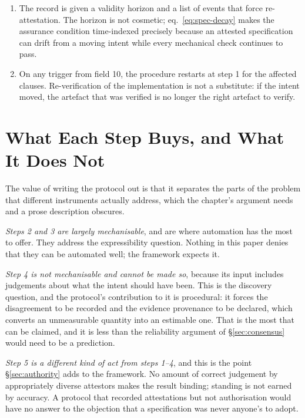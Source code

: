 \begin{enumerate}[label=\textbf{P\arabic*.},leftmargin=*]
      authorising body adopts the specification. The two acts are distinct and must be separately
      recorded (fields 6 and 7), for the reason \S\ref{sec:authority} gives: a specification can be
      correct and unauthorised, or authorised and wrong.
\item {} The record is given a validity horizon and a list of
      events that force re-attestation. The horizon is not cosmetic; eq.~\eqref{eq:spec-decay}
      makes the assurance condition time-indexed precisely because an attested specification can
      drift from a moving intent while every mechanical check continues to pass.
\item {} On any trigger from field 10, the procedure restarts at step 1
      for the affected clauses. Re-verification of the implementation is not a substitute: if the
      intent moved, the artefact that was verified is no longer the right artefact to verify.
\end{enumerate}

\section{What Each Step Buys, and What It Does Not}

The value of writing the protocol out is that it separates the parts of the problem that different
instruments actually address, which the chapter's argument needs and a prose description obscures.

\emph{Steps 2 and 3 are largely mechanisable}, and are where automation has the most to offer. They
address the expressibility question. Nothing in this paper denies that they can be automated well;
the framework expects it.

\emph{Step 4 is not mechanisable and cannot be made so}, because its input includes judgements about
what the intent should have been. This is the discovery question, and the protocol's contribution to
it is procedural: it forces the disagreement to be recorded and the evidence provenance to be
declared, which converts an unmeasurable quantity into an estimable one. That is the most that can
be claimed, and it is less than the reliability argument of \S\ref{sec:consensus} would need to be
a prediction.

\emph{Step 5 is a different kind of act from steps 1--4}, and this is the point \S\ref{sec:authority}
adds to the framework. No amount of correct judgement by appropriately diverse attestors makes the
result binding; standing is not earned by accuracy. A protocol that recorded attestations but not
authorisation would have no answer to the objection that a specification was never anyone's to
adopt.

